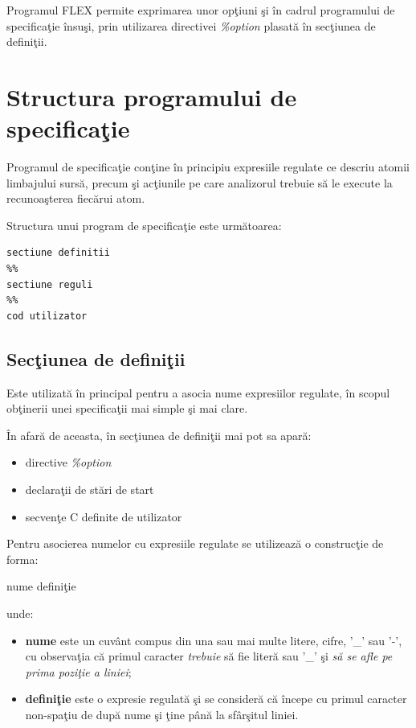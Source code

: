Programul FLEX permite exprimarea unor op\c{t}iuni \c{s}i \^{i}n cadrul programului de specifica\c{t}ie \^{i}nsu\c{s}i, prin utilizarea directivei \emph{\%option} plasat\u{a} \^{i}n sec\c{t}iunea de defini\c{t}ii.

\section{Structura programului de specifica\c{t}ie}
Programul de specifica\c{t}ie con\c{t}ine \^{i}n principiu expresiile regulate ce descriu atomii limbajului surs\u{a}, precum \c{s}i ac\c{t}iunile pe care analizorul trebuie s\u{a} le execute la recunoa\c{s}terea fiec\u{a}rui atom.

Structura unui program de specifica\c{t}ie este urm\u{a}toarea:
\begin{verbatim}
sectiune definitii
%%
sectiune reguli
%%
cod utilizator
\end{verbatim}

\subsection{Sec\c{t}iunea de defini\c{t}ii}
Este utilizat\u{a} \^{i}n principal pentru a asocia nume expresiilor regulate, \^{i}n scopul ob\c{t}inerii unei specifica\c{t}ii mai simple \c{s}i mai clare.

\^{I}n afar\u{a} de aceasta, \^{i}n sec\c{t}iunea de defini\c{t}ii mai pot sa apar\u{a}:
\begin{itemize}
	\item directive \emph{\%option}
	\item declara\c{t}ii de st\u{a}ri de start
	\item secven\c{t}e C definite de utilizator
\end{itemize}
Pentru asocierea numelor cu expresiile regulate se utilizeaz\u{a} o construc\c{t}ie de forma:
\begin{center}
nume defini\c{t}ie
\end{center}
unde:
\begin{itemize}
	\item \textbf{nume} este un cuv\^{a}nt compus din una sau mai multe litere, cifre, '\_' sau '-', cu observa\c{t}ia c\u{a} primul caracter \emph{trebuie} s\u{a} fie liter\u{a} sau '\_' \c{s}i \emph{s\u{a} se afle pe prima pozi\c{t}ie a liniei};
	\item \textbf{defini\c{t}ie} este o expresie regulat\u{a} \c{s}i se consider\u{a} c\u{a} \^{i}ncepe cu primul caracter non-spa\c{t}iu de dup\u{a} nume \c{s}i \c{t}ine p\^{a}n\u{a} la sf\^{a}r\c{s}itul liniei.
\end{itemize}

